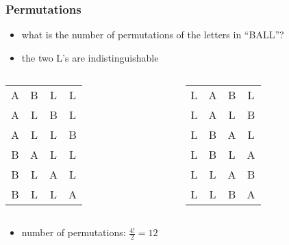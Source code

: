\documentclass[dvipsnames]{beamer}
\begin{document}
\begin{frame}
  \frametitle{Permutations}

  \begin{example}
    \begin{itemize}
      \item what is the number of permutations of the letters in ``BALL''?
      \item the two L's are indistinguishable
    \end{itemize}

    \pause
    \begin{columns}[t]
      \begin{tabular}{c c c c}
 A & B & L & L\\
 A & L & B & L\\
 A & L & L & B\\
 B & A & L & L\\
 B & L & A & L\\
 B & L & L & A
      \end{tabular}

      \begin{tabular}{c c c c}
 L & A & B & L\\
 L & A & L & B\\
 L & B & A & L\\
 L & B & L & A\\
 L & L & A & B\\
 L & L & B & A
      \end{tabular}
    \end{columns}

    \pause
    \begin{itemize}
      \item number of permutations: $\frac{4!}{2} = 12$
    \end{itemize}
  \end{example}
\end{frame}
\end{document}
